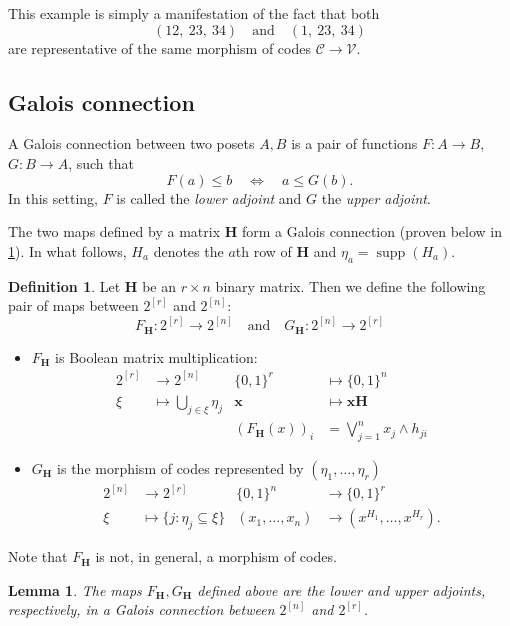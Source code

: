\documentclass[11pt,letterpaper, reqno]{amsart}
\newtheorem{lem}[thm]{Lemma}         %
\theoremstyle{definition}
\newtheorem{defn}[thm]{Definition}   %
\DeclareMathOperator{\supp}{supp}
\def\bx{\mathbf{x}}
\def\bH{\mathbf{H}}
\def\cC{\mathcal{C}}
\def\cV{\mathcal{V}}
\begin{document}
    This example is simply a manifestation of the fact that both
    \[ (12,~23,~34)\quad \text{and} \quad(1,~23,~34)\] 
    are representative of the same morphism of codes $\cC \to \cV$.

\subsection{Galois connection}
    
    A Galois connection between two posets $A,B$ is a pair of functions $F: A \to B$, $G: B\to A$, such that
            \[ F(a) \leq b \quad \iff \quad a \leq G(b). \] 
        In this setting, $F$ is called the \emph{lower adjoint} and $G$ the \emph{upper adjoint}.
    
        The two maps defined by a matrix $\bH$ form a Galois connection (proven below in \cref{lem:galoisconnection}).
        In what follows, $H_a$ denotes the $a$th row of $\bH$ and $\eta_a = \supp(H_a)$. 
        \begin{defn}\label{def:galoisconnectionofH}
            Let $\bH$ be an $r \times n$ binary matrix. Then we define the following pair of maps between $2^{[r]}$ and $2^{[n]}$:
            \[ F_{\bH}: 2^{[r]} \to 2^{[n]} \quad \text{and} \quad G_{\bH}: 2^{[n]} \to 2^{[r]} \]
            \begin{itemize}
                \item $F_{\bH}$ is Boolean matrix multiplication:
                    \begin{align}
                        2^{[r]} & \to 2^{[n]} & \{0,1\}^r & \mapsto \{0,1\}^n\nonumber\\
                        \xi &\mapsto \bigcup_{j\in\xi} \eta_j & \bx &\mapsto \bx\bH\label{eq:galoisF}\\
                        & & (F_\bH(x))_i & = \bigvee_{j=1}^n x_j \wedge h_{ji}
                    \end{align}
                \item $G_{\bH}$ is the morphism of codes represented by $(\eta_1,\dots,\eta_r)$
                    \begin{align}
                        2^{[n]} & \to 2^{[r]} & \{0,1\}^n & \to \{0,1\}^r\nonumber\\
                        \xi & \mapsto \{j : \eta_j \subseteq \xi\}
                         & (x_1,\dots,x_n) & \to (x^{H_1},\dots, x^{H_r})\label{eq:galoisG}.
                    \end{align}
            \end{itemize}
        \end{defn}
    \noindent Note that $F_\bH$ is not, in general, a morphism of codes.
    \begin{lem}\label{lem:galoisconnection}
            The maps $F_{\bH},G_{\bH}$ defined above are the lower and upper adjoints, respectively, in a Galois connection between $2^{[n]}$ and $2^{[r]}$.
        \end{lem}
        
\end{document}
